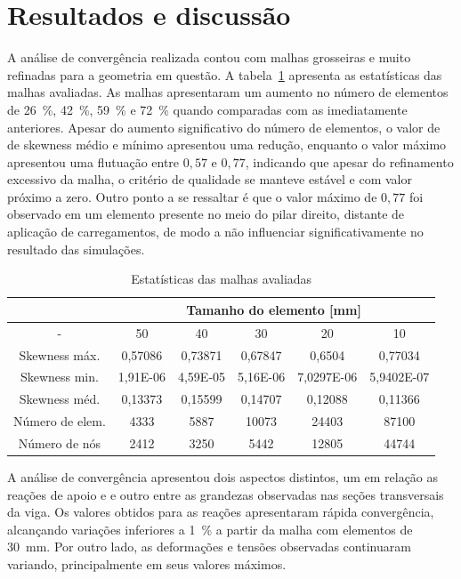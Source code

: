 \documentclass[a4paper, 12pt]{article}
\begin{document}
\section{Resultados e discussão}

A análise de convergência realizada contou com malhas grosseiras e muito refinadas para a geometria em questão. A tabela~\ref{tab:estat malha} apresenta as estatísticas das malhas avaliadas. As malhas apresentaram um aumento no número de elementos de 26~\%, 42~\%, 59~\% e 72~\% quando comparadas com as imediatamente anteriores. Apesar do aumento significativo do número de elementos, o valor de de skewness médio e mínimo apresentou uma redução, enquanto o valor máximo apresentou uma flutuação entre $0,57$ e $0,77$, indicando que apesar do refinamento excessivo da malha, o critério de qualidade se manteve estável e com valor próximo a zero. Outro ponto a se ressaltar é que o valor máximo de $0,77$ foi observado em um elemento presente no meio do pilar direito, distante de aplicação de carregamentos, de modo a não influenciar significativamente no resultado das simulações.

\begin{table}[h!]
\centering
\caption{Estatísticas das malhas avaliadas}

\renewcommand{\arraystretch}{1.3}

\begin{tabular}{c c c c c c}
\hline
 & \multicolumn{5}{c}{Tamanho do elemento [mm]}\\
 
\hline
- & 50 & 40 & 30 & 20 & 10\\ 
\hline
\hline
Skewness máx.    & 0,57086 & 0,73871 & 0,67847 & 0,6504 & 0,77034 \\
Skewness min.    & 1,91E-06  & 4,59E-05 & 5,16E-06 & 7,0297E-06 & 5,9402E-07 \\
Skewness méd.    & 0,13373 & 0,15599 & 0,14707 & 0,12088 & 0,11366 \\
Número de elem.  & 4333 & 5887 & 10073 & 24403 & 87100 \\
Número de nós    & 2412 & 3250 & 5442 & 12805 & 44744 \\
\hline
\end{tabular}

\label{tab:estat malha}
\end{table}

A análise de convergência apresentou dois aspectos distintos, um em relação as reações de apoio e e outro entre as grandezas observadas nas seções transversais da viga. Os valores obtidos para as reações apresentaram rápida convergência, alcançando variações inferiores a 1~\% a partir da malha com elementos de 30~mm. Por outro lado, as deformações e tensões observadas continuaram variando, principalmente em seus valores máximos. 
\end{document}
